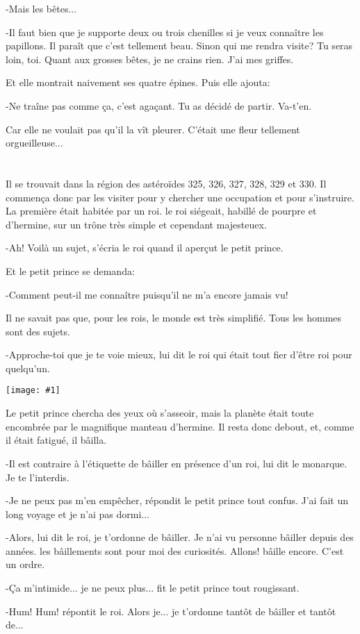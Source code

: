 \documentclass{report}
\newcommand{\parachapter}[2][]{\chapter[#1]{#2}}
\newcommand{\incpic}[1]{%
\begin{center}
    \texttt{[image: \#1]}
\end{center}%
}
\begin{document}
-Mais les bêtes...

-Il faut bien que je supporte deux ou trois chenilles si je veux connaître les papillons. Il paraît que c'est tellement beau. Sinon qui me rendra visite? Tu seras loin, toi. Quant aux grosses bêtes, je ne crains rien. J'ai mes griffes.

Et elle montrait naivement ses quatre épines. Puis elle ajouta:

-Ne traîne pas comme ça, c'est agaçant. Tu as décidé de partir. Va-t'en.

Car elle ne voulait pas qu'il la vît pleurer. C'était une fleur tellement orgueilleuse...

\parachapter{} %
Il se trouvait dans la région des astéroïdes 325, 326, 327, 328, 329 et 330. Il commença donc par les visiter pour y chercher une occupation et pour s'instruire.
La première était habitée par un roi. le roi siégeait, habillé de pourpre et d'hermine, sur un trône très simple et cependant majesteuex.

-Ah! Voilà un sujet, s'écria le roi quand il aperçut le petit prince.

Et le petit prince se demanda:

-Comment peut-il me connaître puisqu'il ne m'a encore jamais vu!

Il ne savait pas que, pour les rois, le monde est très simplifié. Tous les hommes sont des sujets.

-Approche-toi que je te voie mieux, lui dit le roi qui était tout fier d'être roi pour quelqu'un.

\incpic{pic/image25.jpeg}

Le petit prince chercha des yeux où s'asseoir, mais la planète était toute encombrée par le magnifique manteau d'hermine. Il resta donc debout, et, comme il était fatigué, il bâilla.

-Il est contraire à l'étiquette de bâiller en présence d'un roi, lui dit le monarque. Je te l'interdis.

-Je ne peux pas m'en empêcher, répondit le petit prince tout confus. J'ai fait un long voyage et je n'ai pas dormi...

-Alors, lui dit le roi, je t'ordonne de bâiller. Je n'ai vu personne bâiller depuis des années. les bâillements sont pour moi des curiosités. Allons! bâille encore. C'est un ordre.

-Ça m'intimide... je ne peux plus... fit le petit prince tout rougissant.

-Hum! Hum! répontit le roi. Alors je... je t'ordonne tantôt de bâiller et tantôt de...
\end{document}
